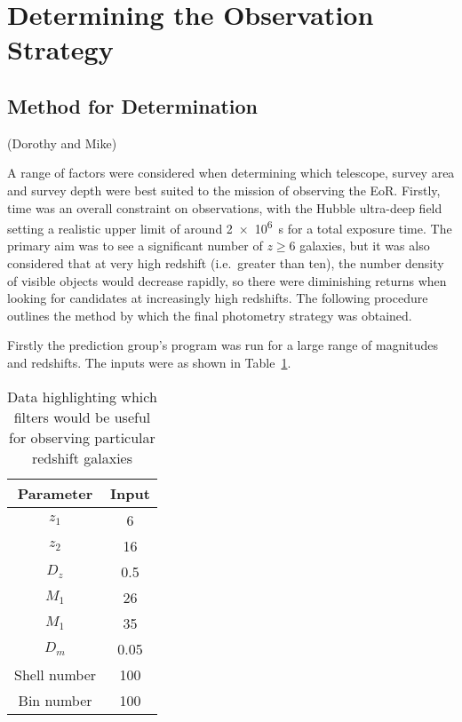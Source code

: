 
\section{Determining the Observation Strategy} %
\label{sec:method_for_strategy_choosing}
	\subsection{Method for Determination} %
	\label{sub:method_for_determination}
	(Dorothy and Mike)

		A range of factors were considered when determining which telescope, survey area and survey depth were best suited to the mission of observing the EoR. Firstly, time was an overall constraint on observations, with the Hubble ultra-deep field setting a realistic upper limit of around \SI{2e6}{\second} for a total exposure time. The primary aim was to see a significant number of $z\ge6$ galaxies, but it was also considered that at very high redshift (i.e.\ greater than ten), the number density of visible objects would decrease rapidly, so there were diminishing returns when looking for candidates at increasingly high redshifts. The following procedure outlines the method by which the final photometry strategy was obtained.

		Firstly the prediction group's program was run for a large range of magnitudes and redshifts. The inputs were as shown in Table~\ref{tab:program_inputs}.
		\begin{table}[htbp]
			\begin{center}
				\begin{tabular}{c|c}
					Parameter 	& Input \\
					\hline \hline
					$z_1$ & 6 \\
					$z_2$ & 16 \\
					$D_z$ & 0.5 \\
					$M_1$ & 26 \\
					$M_1$ & 35 \\
					$D_m$ & 0.05 \\
					Shell number & 100 \\
					Bin number & 100
				\end{tabular}
			\end{center}
			\caption{Data highlighting which filters would be useful for observing particular redshift galaxies\cite{Galactic_Astronomy_Binney_Merrifield}\label{tab:program_inputs}}
		\end{table}

